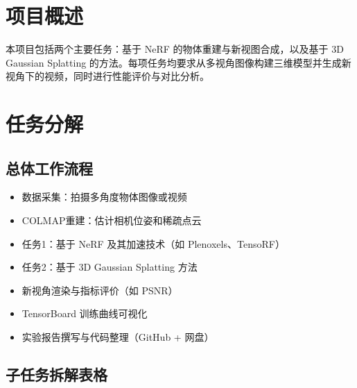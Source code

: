 \documentclass[a4paper,12pt]{article}
\begin{document}
\section{项目概述}
本项目包括两个主要任务：基于 NeRF 的物体重建与新视图合成，以及基于 3D Gaussian Splatting 的方法。每项任务均要求从多视角图像构建三维模型并生成新视角下的视频，同时进行性能评价与对比分析。

\section{任务分解}

\subsection*{总体工作流程}

\begin{itemize}[label=--]
    \item 数据采集：拍摄多角度物体图像或视频
    \item COLMAP重建：估计相机位姿和稀疏点云
    \item 任务1：基于 NeRF 及其加速技术（如 Plenoxels、TensoRF）
    \item 任务2：基于 3D Gaussian Splatting 方法
    \item 新视角渲染与指标评价（如 PSNR）
    \item TensorBoard 训练曲线可视化
    \item 实验报告撰写与代码整理（GitHub + 网盘）
\end{itemize}

\subsection*{子任务拆解表格}
\end{document}
